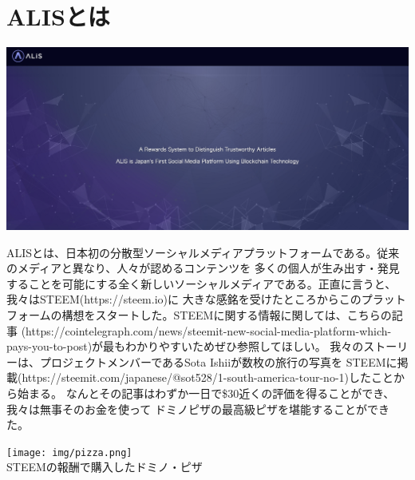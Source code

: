 \documentclass{jsarticle}
\begin{document}
\section{ALISとは}
\begin{center}
	\includegraphics[scale=0.25]{img/aliscover.png}
\end{center}
ALISとは、日本初の分散型ソーシャルメディアプラットフォームである。従来のメディアと異なり、人々が認めるコンテンツを
多くの個人が生み出す・発見することを可能にする全く新しいソーシャルメディアである。正直に言うと、我々はSTEEM(https://steem.io)に
大きな感銘を受けたところからこのプラットフォームの構想をスタートした。STEEMに関する情報に関しては、こちらの記事
(https://cointelegraph.com/news/steemit-new-social-media-platform-which-pays-you-to-post)が最もわかりやすいためぜひ参照してほしい。
我々のストーリーは、プロジェクトメンバーであるSota Ishiiが数枚の旅行の写真を
STEEMに掲載(https://steemit.com/japanese/@sot528/1-south-america-tour-no-1)したことから始まる。
なんとその記事はわずか一日で\$30近くの評価を得ることができ、我々は無事そのお金を使って
ドミノピザの最高級ピザを堪能することができた。

\begin{center}
	\texttt{[image: img/pizza.png]} \\
	STEEMの報酬で購入したドミノ・ピザ
\end{center}
\end{document}
